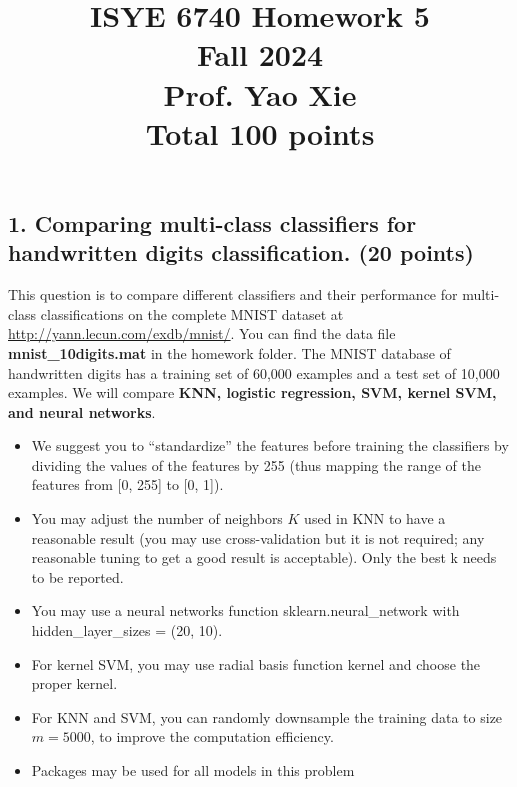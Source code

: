 \documentclass[twoside,10pt]{article}
\begin{document}
\title{ISYE 6740 Homework 5 \\ 
Fall 2024\\ 
Prof. Yao Xie\\
 Total 100 points}
\date{}
\maketitle








\subsection*{1. Comparing multi-class classifiers for handwritten digits classification. (20 points)}

This question is to compare different classifiers and their performance for multi-class classifications on the complete MNIST dataset at \url{http://yann.lecun.com/exdb/mnist/}. You can find the data file \textbf{mnist\_10digits.mat} in the homework folder. The MNIST database of handwritten digits has a training set of 60,000 examples and a test set of 10,000 examples. We will compare {\bf KNN, logistic regression, SVM, kernel SVM, and neural networks}. 

\begin{itemize}

\item We suggest you to ``standardize'' the features before training the classifiers by dividing the values of the features by 255 (thus mapping the range of the features from [0, 255] to [0, 1]).

\item You may adjust the number of neighbors $K$ used in KNN to have a reasonable result (you may use cross-validation but it is not required; any reasonable tuning to get a good result is acceptable). Only the best k needs to be reported.

\item You may use a neural networks function \textsf{sklearn.neural\_network} with \textsf{hidden\_layer\_sizes = (20, 10)}. 


\item For kernel SVM, you may use radial basis function kernel and choose the proper kernel.

\item For KNN and SVM, you can randomly downsample the training data to size $m=5000$, to improve the computation efficiency. 

\item Packages may be used for all models in this problem
\end{itemize}
\end{document}
